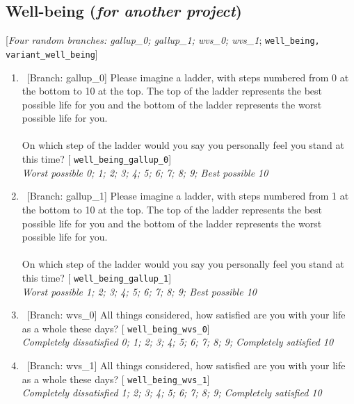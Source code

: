  \subsection*{Well-being (\textit{for another project})} 
  [\textit{Four random branches: gallup\_0; gallup\_1; wvs\_0; wvs\_1}; %
 \verb|well_being, variant_well_being|] 
 \begin{enumerate}[resume] %
\item ~[Branch: gallup\_0] \label{q:well_being_gallup_0} Please imagine a ladder, with steps numbered from 0 at the bottom to 10 at the top. The top of the ladder represents the best possible life for you and the bottom of the ladder represents the worst possible life for you. \\\\On which step of the ladder would you say you personally feel you stand at this time? [%
\verb|well_being_gallup_0|]
  \\ \textit{Worst possible 0; 1; 2; 3; 4; 5; 6; 7; 8; 9; Best possible 10}

\item ~[Branch: gallup\_1] \label{q:well_being_gallup_1} Please imagine a ladder, with steps numbered from 1 at the bottom to 10 at the top. The top of the ladder represents the best possible life for you and the bottom of the ladder represents the worst possible life for you. \\\\On which step of the ladder would you say you personally feel you stand at this time? [%
\verb|well_being_gallup_1|]
  \\ \textit{Worst possible 1; 2; 3; 4; 5; 6; 7; 8; 9; Best possible 10}

\item ~[Branch: wvs\_0] \label{q:well_being_wvs_0} All things considered, how satisfied are you with your life as a whole these days? [%
\verb|well_being_wvs_0|]
  \\ \textit{Completely dissatisfied 0; 1; 2; 3; 4; 5; 6; 7; 8; 9; Completely satisfied 10}

\item ~[Branch: wvs\_1] \label{q:well_being_wvs_1} All things considered, how satisfied are you with your life as a whole these days? [%
\verb|well_being_wvs_1|]
  \\ \textit{Completely dissatisfied 1; 2; 3; 4; 5; 6; 7; 8; 9; Completely satisfied 10}

\end{enumerate} 

